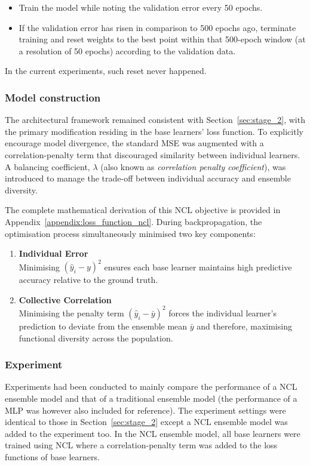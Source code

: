 \documentclass{article}
\begin{document}
\begin{itemize}
    \item Train the model while noting the validation error every 50 epochs. 
    \item If the validation error has risen in comparison to 500 epochs ago, terminate training and reset weights to the best point within that 500-epoch window (at a resolution of 50 epochs) according to the validation data. 
\end{itemize}

In the current experiments, such reset never happened. 


\subsubsection{Model construction}
The architectural framework remained consistent with Section~\ref{sec:stage_2}, with the primary modification residing in the base learners' loss function. To explicitly encourage model divergence, the standard MSE was augmented with a correlation-penalty term that discouraged similarity between individual learners. A balancing coefficient, $\lambda$ (also known as \textit{correlation penalty coefficient}), was introduced to manage the trade-off between individual accuracy and ensemble diversity. 

The complete mathematical derivation of this NCL objective is provided in Appendix~\ref{appendix:loss_function_ncl}. During backpropagation, the optimisation process simultaneously minimised two key components: 

\begin{enumerate}
    \item \textbf{Individual Error} \\
    Minimising $(\hat{y}_i - y)^2$ ensures each base learner maintains high predictive accuracy relative to the ground truth. 

    \item \textbf{Collective Correlation} \\
    Minimising the penalty term $(\hat{y}_i - \bar{y})^2$ forces the individual learner's prediction to deviate from the ensemble mean $\bar{y}$ and therefore, maximising functional diversity across the population. 
\end{enumerate}


\subsubsection{Experiment}
Experiments had been conducted to mainly compare the performance of a NCL ensemble model and that of a traditional ensemble model (the performance of a MLP was however also included for reference). The experiment settings were identical to those in Section~\ref{sec:stage_2} except a NCL ensemble model was added to the experiment too. In the NCL ensemble model, all base learners were trained using NCL where a correlation-penalty term was added to the loss functions of base learners. 
\end{document}
